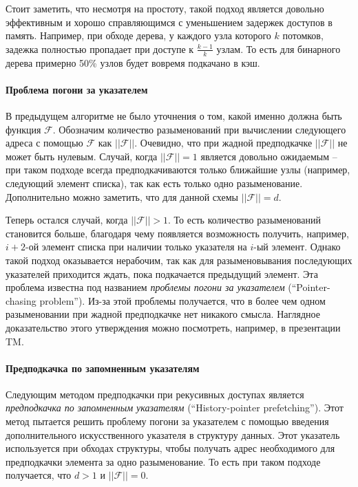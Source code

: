 \documentclass[12pt,a4paper]{article}
\begin{document}
Стоит заметить, что несмотря на простоту, такой подход является довольно эффективным и хорошо справляющимся с уменьшением задержек доступов в память. Например, при обходе дерева, у каждого узла которого $k$ потомков, задежка полностью пропадает при доступе к $\frac{k-1}{k}$ узлам. То есть для бинарного дерева примерно 50\% узлов будет вовремя подкачано в кэш.

\paragraph{Проблема погони за указателем}

В предыдущем алгоритме не было уточнения о том, какой именно должна быть функция $\mathcal{F}$. Обозначим количество разыменований при вычислении следующего адреса с помощью $\mathcal{F}$ как $||\mathcal{F}||$. Очевидно, что при жадной предподкачке $||\mathcal{F}||$ не может быть нулевым. Случай, когда $||\mathcal{F}|| = 1$ является довольно ожидаемым -- при таком подходе всегда предподкачиваются только ближайшие узлы (например, следующий элемент списка), так как есть только одно разыменование. Дополнительно можно заметить, что для данной схемы $||\mathcal{F}|| = d$.

Теперь остался случай, когда $||\mathcal{F}|| > 1$. То есть количество разыменований становится больше, благодаря чему появляется возможность получить, например, $i+2$-ой элемент списка при наличии только указателя на $i$-ый элемент. Однако такой подход оказывается нерабочим, так как для разыменовывания последующих указателей приходится ждать, пока подкачается предыдущий элемент. Эта проблема известна под названием \emph{проблемы погони за указателем} (``Pointer-chasing problem''). Из-за этой проблемы получается, что в более чем одном разыменовании при жадной предподкачке нет никакого смысла. Наглядное доказательство этого утверждения можно посмотреть, например, в презентации TM.

\paragraph{Предподкачка по запомненным указателям}

Следующим методом предподкачки при рекусивных доступах является \emph{предподкачка по запомненным указателям} (``History-pointer prefetching''). Этот метод пытается решить проблему погони за указателем с помощью введения дополнительного искусственного указателя в структуру данных. Этот указатель используется при обходах структуры, чтобы получать адрес необходимого для предподкачки элемента за одно разыменование. То есть при таком подходе получается, что $d > 1$ и $||\mathcal{F}|| = 0$.
\end{document}
